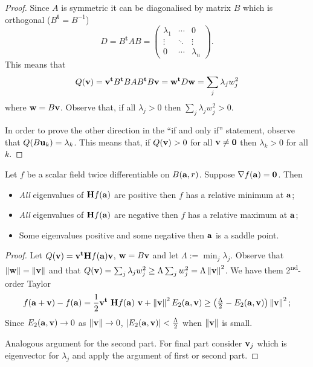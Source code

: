 \begin{proof}
    Since \(A\) is symmetric it can be diagonalised by  matrix \(B\)  which is orthogonal (\(B^{\mathbf{t}}=B^{-1}\))
    \[
        D = B^{\mathbf{t}} A B =
        \begin{pmatrix}
            \lambda_1 & \cdots & 0         \\
            \vdots    & \ddots & \vdots    \\
            0         & \cdots & \lambda_n
        \end{pmatrix}.
    \]
    This means that
    \[
        Q(\vv) = \vv^{\mathbf{t}} B^{\mathbf{t}} B A B^{\mathbf{t}} B \vv  = \ww^{\mathbf{t}} D \ww = \sum_{j} \lambda_j w_j^2
    \]
    where \(\ww = B \vv\).
    Observe that, if all \(\lambda_j >0\) then \( \sum_{j} \lambda_j w_j^2  >0\).

    In order to prove the other direction in the ``if and only if'' statement, observe that \(Q(B \uu_k ) = \lambda_k\). This means that, if \(Q(\vv) > 0\) for all \(\vv \neq \mathbf{0}\) then \(\lambda_k>0\) for all \(k\).
\end{proof}

\begin{theorem}
    Let \(f\) be a scalar field twice differentiable on \(B(\aa,r)\).
    Suppose  \(\nabla f(\aa) = \mathbf{0}\).
    Then
    \begin{itemize}
        \item \emph{All} eigenvalues of \(\mathbf{H} f (\aa)\) are positive then \(f\) has a relative minimum at \(\aa\);
        \item \emph{All} eigenvalues of \(\mathbf{H} f (\aa)\) are negative then \(f\) has a relative maximum at \(\aa\);
        \item Some eigenvalues positive and some negative then \(\aa\) is a saddle point.
    \end{itemize}
\end{theorem}

\begin{proof}
    Let \(Q(\vv) =  \vv^{\mathbf{t}} \mathbf{H} f (\aa) \vv  \),  \(\ww = B \vv\) and let \(\Lambda := \min_j \lambda_j\).
    Observe that \(\norm{\ww} =  \norm{\vv}\) and that \(Q(\vv)=  \sum_{j} \lambda_j w_j^2  \geq \Lambda \sum_{j} w_j^2 = \Lambda  \norm{\vv}^2 \).
    We have them 2\textsuperscript{nd}-order Taylor
    \[
        f(\aa+\vv) - f(\aa)
        =  \frac{1}{2} \vv^{\mathbf{t}} \ \mathbf{H} f (\aa) \ \vv + \norm{\vv}^2 E_2(\aa,\vv)
        \geq  \left(\tfrac{\Lambda}{2} - E_2(\aa,\vv) \right) \norm{\vv}^2;
    \]
    Since \(E_2(\aa,\vv) \to 0\) as \(\norm{\vv}\to 0\), \(\abs{E_2(\aa,\vv)} < \tfrac{\Lambda}{2}\) when \(\norm{\vv}\) is small.

    Analogous argument for the second part. For final part consider \(\vv_j\) which is eigenvector for \(\lambda_j\) and apply the argument of first or second part.
\end{proof}

